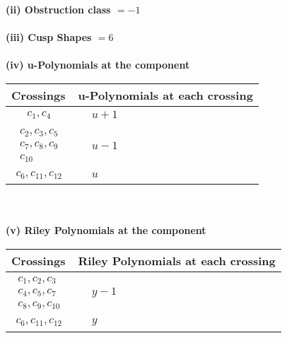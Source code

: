 \documentclass[1p]{elsarticle_modified}
\theoremstyle{definition}
\begin{document}
\flushleft \textbf{(ii) Obstruction class $= -1$}\\~\\
\flushleft \textbf{(iii) Cusp Shapes $= 6$}\\~\\
\newpage\renewcommand{\arraystretch}{1}
\flushleft \textbf{(iv) u-Polynomials at the component}\newline \\
\begin{tabular}{m{50pt}|m{274pt}}
Crossings & \hspace{64pt}u-Polynomials at each crossing \\
\hline $$\begin{aligned}c_{1},c_{4}\end{aligned}$$&$\begin{aligned}
&u+1
\end{aligned}$\\
\hline $$\begin{aligned}c_{2},c_{3},c_{5}\\c_{7},c_{8},c_{9}\\c_{10}\end{aligned}$$&$\begin{aligned}
&u-1
\end{aligned}$\\
\hline $$\begin{aligned}c_{6},c_{11},c_{12}\end{aligned}$$&$\begin{aligned}
&u
\end{aligned}$\\
\hline
\end{tabular}\\~\\
\newpage\renewcommand{\arraystretch}{1}
\flushleft \textbf{(v) Riley Polynomials at the component}\newline \\
\begin{tabular}{m{50pt}|m{274pt}}
Crossings & \hspace{64pt}Riley Polynomials at each crossing \\
\hline $$\begin{aligned}c_{1},c_{2},c_{3}\\c_{4},c_{5},c_{7}\\c_{8},c_{9},c_{10}\end{aligned}$$&$\begin{aligned}
&y-1
\end{aligned}$\\
\hline $$\begin{aligned}c_{6},c_{11},c_{12}\end{aligned}$$&$\begin{aligned}
&y
\end{aligned}$\\
\hline
\end{tabular}\\~\\
\end{document}
